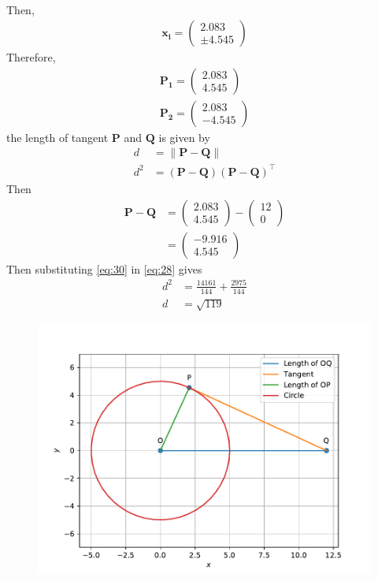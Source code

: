 \documentclass[12pt]{article}
\providecommand{\norm}[1]{\left\lVert#1\right\rVert}
\newcommand{\myvec}[1]{\ensuremath{\begin{pmatrix}#1\end{pmatrix}}}
\let\vec\mathbf
\begin{document}
\begin{enumerate}
\begin{align}
\end{align}
Then,
\begin{align}
\vec{x_i} = \myvec{2.083\\ \pm 4.545}
\end{align}
Therefore,
\begin{align}
\vec{P_1} = \myvec{2.083 \\ 4.545} \\
\vec{P_2} = \myvec{2.083 \\ -4.545}
\end{align}
the length of tangent $\vec{P}$ and $\vec{Q}$ is given by
\begin{align}
d&=\norm{\vec{P}-\vec{Q}}\\
	d^2&=(\vec{P}-\vec{Q})(\vec{P}-\vec{Q})^{\top}\label{eq:28}
\end{align}
Then
\begin{align}
	\vec{P}-\vec{Q}&=\myvec{2.083\\4.545}-\myvec{12\\0}\\
	&=\myvec{-9.916\\4.545}\label{eq:30}
\end{align}
Then substituting \eqref{eq:30} in \eqref{eq:28} gives
\begin{align}
	d^2&=\frac{14161}{144}+\frac{2975}{144}\\
	d&=\sqrt{119}
\end{align}
\begin{figure}[!h]
 \begin{center}
 \includegraphics[width=\columnwidth]{figs/fig.pdf}
 \end{center}
\caption{}
\label{fig:Fig1}
\end{figure}
\end{enumerate}
\end{document}
